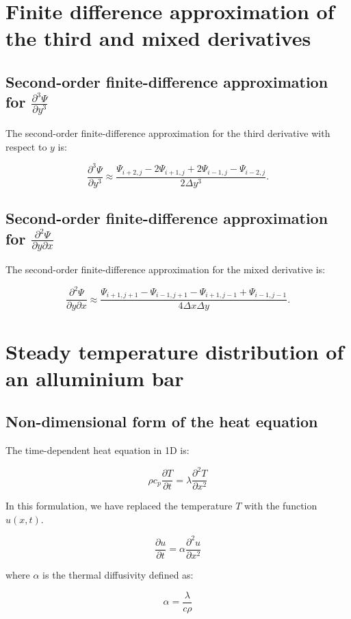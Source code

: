 \documentclass{article}
\begin{document}
\section{Finite difference approximation of the third and mixed derivatives}
\subsection{ Second-order finite-difference approximation for $\frac{\partial^3 \Psi}{\partial y^3}$}

The second-order finite-difference approximation for the third derivative with respect to $y$ is:

\[
\frac{\partial^3 \Psi}{\partial y^3} \approx \frac{\Psi_{i+2, j} - 2\Psi_{i+1, j} + 2\Psi_{i-1, j} - \Psi_{i-2, j}}{2 \Delta y^3}.
\]

\subsection{ Second-order finite-difference approximation for $\frac{\partial^2 \Psi}{\partial y \partial x}$}

The second-order finite-difference approximation for the mixed derivative is:

\[
\frac{\partial^2 \Psi}{\partial y \partial x} \approx \frac{\Psi_{i+1, j+1} - \Psi_{i-1, j+1} - \Psi_{i+1, j-1} + \Psi_{i-1, j-1}}{4 \Delta x \Delta y}.
\]

\section{Steady temperature distribution of an alluminium bar}

\subsection{Non-dimensional form of the heat equation}

The time-dependent heat equation in 1D is:

\[
\rho c_p \frac{\partial T}{\partial t} = \lambda \frac{\partial^2 T}{\partial x^2}
\]

In this formulation, we have replaced the temperature \(T\) with the function \(u(x, t)\).

\[
\frac{\partial u}{\partial t} = \alpha \frac{\partial^2 u}{\partial x^2}
\]

where \(\alpha\) is the thermal diffusivity defined as:

\[
\alpha = \frac{\lambda}{c \rho} 
\]
\end{document}
